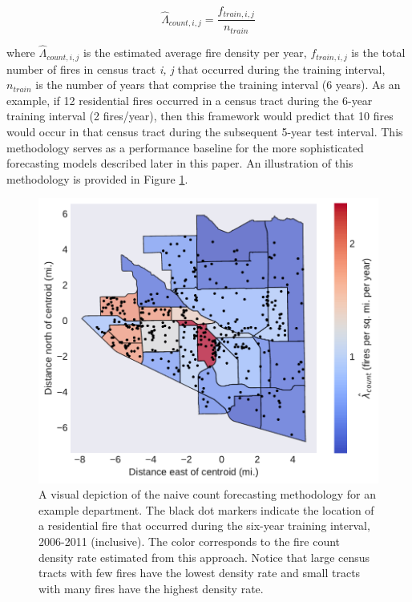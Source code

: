 \documentclass{svjour3}
\begin{document}
\begin{equation}
  \label{eqn:naive_count}
  \hat{\Lambda}_{count,i,j} = \frac{f_{train,i,j}}{n_{train}} 
\end{equation}

\noindent where $\hat{\Lambda}_{count,i,j}$ is the estimated average fire density per year, $f_{train,i,j}$ is the total number of fires in census tract \textit{i, j} that occurred during the training interval, $n_{train}$ is the number of years that comprise the training interval (6 years). As an example, if 12 residential fires occurred in a census tract during the 6-year training interval (2 fires/year), then this framework would predict that 10 fires would occur in that census tract during the subsequent 5-year test interval. This methodology serves as a performance baseline for the more sophisticated forecasting models described later in this paper. An illustration of this methodology is provided in Figure \ref{fig:spatial_histogram}. 


\begin{figure}[htb] \centering
\includegraphics[width=.75\textwidth]{./figures/spatial_histogram.pdf}
\caption{A visual depiction of the naive count forecasting methodology for an example department. The black dot markers indicate the location of a residential fire that occurred during the six-year training interval, 2006-2011 (inclusive). The color corresponds to the fire count density rate estimated from this approach. Notice that large census tracts with few fires have the lowest density rate and small tracts with many fires have the highest density rate.}
\label{fig:spatial_histogram}
\end{figure}
\end{document}

